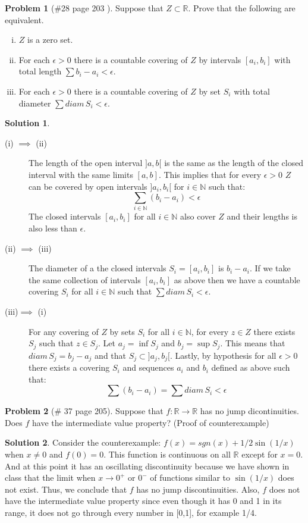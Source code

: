 \documentclass{article}
\theoremstyle{definition}
\newtheorem*{soln}{Solution}
\newtheorem*{prob}{Problem}
\theoremstyle{theorem}
\newcommand{\R}{\mathbb{R}}
\newcommand{\N}{\mathbb{N}}
\begin{document}
\begin{prob}[\#28 page 203   ]
    Suppose that $Z\subset \R$. Prove that the following are equivalent.
    \begin{enumerate}[(i)]
        \item $Z$ is a zero set.
        \item For each $\epsilon>0$ there is a countable covering of $Z$ by intervals $[a_i, b_i]$ with total length $\sum b_i - a_i <\epsilon$.
        \item For each $\epsilon>0$ there is a countable covering of $Z$ by set $S_i$ with total diameter $\sum diam\, S_i <\epsilon$.

    \end{enumerate}
\end{prob}
\begin{soln}
\begin{description}
    \item[(i) $\implies$ (ii)] The length of the open interval $]a,b[$ is the same as the length of the closed interval with the same limits $[a,b]$. This implies that for every $\epsilon >0$ $Z$ can be covered by open intervals $]a_i,b_i[$ for $i\in \N$ such that:
        $$\sum_{i\in \N }(b_i-a_i)<\epsilon $$
        The closed intervals $[a_i,b_i]$ for all $i\in \N$ also cover $Z$ and their lengths is also less than $\epsilon$.
    \item[(ii) $\implies$ (iii)] The diameter of a the closed intervals $S_i = [a_i, b_i]$ is $b_i -a_i$. If we take the same collection of intervals $[a_i,b_i]$ as above then we have a countable covering $S_i$ for all $i\in \N$ such that $\sum diam\, S_i <\epsilon$.
    \item[(iii)$\implies$ (i)] For any covering of $Z$ by sets $S_i$ for all $i\in \N$, for every $z\in Z$ there exists $S_j$ such that $z\in S_j$.  Let $a_j= \inf S_j$ and $b_j = \sup S_j$. This means that $diam \, S_j = b_j-a_j$ and that $S_j \subset ]a_j, b_j[$. Lastly, by hypothesis for all $\epsilon >0$  there exists a covering $S_i$  and sequences $a_i$ and $b_i$ defined as above such that:
        $$\sum (b_i - a_i) = \sum diam\, S_i < \epsilon$$
\end{description}
\end{soln}
\vspace{1in}


\begin{prob}[\# 37  page 205]
    Suppose that $f: \R \to \R$ has no jump dicontinuities. Does $f$ have the intermediate value property? (Proof of counterexample)
\end{prob}
\begin{soln}
    Consider the counterexample: $f(x) =sgn(x) + 1/2\sin(1/x)$ when $x\neq 0$ and $f(0)=0$. This function is continuous on all $\R$ except for $x=0$. And at  this point it has an oscillating discontinuity because we have shown in class that the limit when $x\to 0^+$ or $0^-$ of functions similar to $\sin(1/x)$ does not exist. Thus, we conclude that $f$ has no jump discontinuities. Also, $f$ does not have the intermediate value property since even though it has 0  and  1 in its range, it does not go through every number in [0,1], for example 1/4.
\end{soln}
\vspace{1in}
\end{document}
